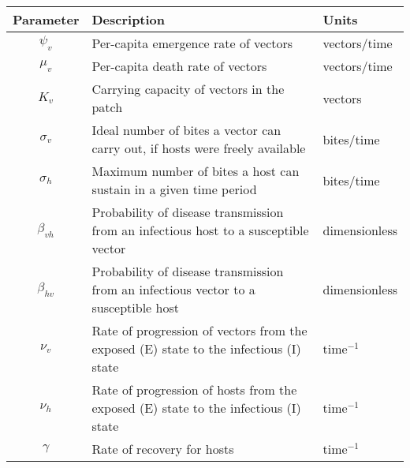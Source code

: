 \begin{table}[h]
    \centering
    \begin{adjustbox}{center}
        \footnotesize
        \begin{tabular}{cll} \toprule
            {Parameter} & {Description} & {Units} \\ \midrule
            $\psi_v$  & Per-capita emergence rate of vectors & vectors$/$time \\
            $\mu_v$  & Per-capita death rate of vectors  & vectors$/$time \\
            $K_v$  & Carrying capacity of vectors in the patch  & vectors \\
            $\sigma_v$  & Ideal number of bites a vector can carry out, if hosts were freely available  & bites$/$time \\
            $\sigma_h$  & Maximum number of bites a host can sustain in a given time period & bites$/$time \\
            $\beta_{vh}$  & Probability of disease transmission from an infectious host to a susceptible vector  & dimensionless \\
            $\beta_{hv}$  & Probability of disease transmission from an infectious vector to a susceptible host  & dimensionless \\
            $\nu_v$  & Rate of progression of vectors from the exposed (E) state to the infectious (I) state  & time$^{-1}$ \\
            $\nu_h$  & Rate of progression of hosts from the exposed (E) state to the infectious (I) state  & time$^{-1}$ \\
            $\gamma$ & Rate of recovery for hosts   & time$^{-1}$ \\ \bottomrule
        \end{tabular}
    \end{adjustbox}
    \label{table:manore-params}
\end{table}

